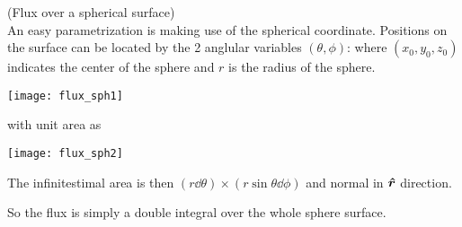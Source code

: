 \documentclass[class=article, crop=false, 12pt]{standalone}
\begin{document}
\begin{example}
    (Flux over a spherical surface)\\
    An easy parametrization is making use of the spherical coordinate.
    Positions on the surface can be located by the 2 anglular variables $(\theta,\phi)$:
    where $(x_0,y_0,z_0)$ indicates the center of the sphere and $r$ is the radius of the sphere.
    
    \begin{center}
        \begin{minipage}{0.2\linewidth}
            \centering
            \texttt{[image: flux\_sph1]}
        \end{minipage}
        \hspace{0.05\textwidth}
        \begin{minipage}{0.2\linewidth}
            \centering
            with unit area as
        \end{minipage}
        \hspace{0.05\textwidth}
        \begin{minipage}{0.2\linewidth}
            \centering
            \texttt{[image: flux\_sph2]}
        \end{minipage}
    \end{center}
    
    The infinitestimal area is then $(r\dd{\theta})\times(r\sin\theta\dd{\phi})$
    and normal in $\vu*{r}$ direction.

    So the flux is simply a double integral over the whole sphere surface.

\end{example}
\end{document}
